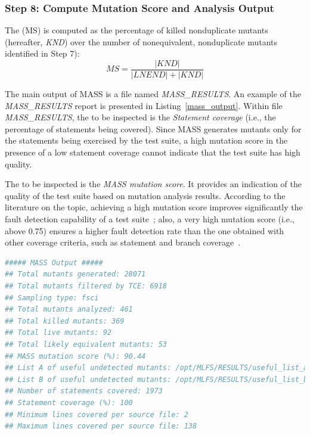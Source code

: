 {\subsubsection{Step 8: Compute Mutation Score and Analysis Output}
\label{sec:appr:score}
%
%
The  (MS) is computed as the percentage of killed nonduplicate mutants
(hereafter, \emph{KND})
over the number of nonequivalent, nonduplicate mutants identified in Step 7):
%
\begin{equation}
\label{equation:ms}
\mathit{MS} = \frac{|\mathit{KND}|}{|\mathit{LNEND}|+|\mathit{KND}|}
\end{equation}



The main output of MASS is a file named \emph{MASS\_RESULTS}. An example of the \emph{MASS\_RESULTS} report is presented in Listing~\ref{mass_output}. Within file \emph{MASS\_RESULTS}, the  to be inspected is the \emph{Statement coverage} (i.e., the percentage of statements being covered). Since MASS generates mutants only for the statements being exercised by the test suite, a high mutation score in the presence of a low statement coverage cannot indicate that the test suite has high quality. 

The  to be inspected is the \emph{MASS mutation score}. It provides an indication of the quality of the test suite based on mutation analysis results. According to the literature on the topic,
 achieving a high mutation score improves significantly the fault detection capability of a test suite~\cite{papadakis2018mutation}; also, a very high mutation score (i.e., above 0.75) ensures a higher fault detection rate than the one obtained with other coverage criteria, such as statement and branch coverage~\cite{Chekam:17}.
 
\begin{lstlisting}[language=bash, label=mass_output, caption=\MASS output obtained with the MLFS case study subject.]
##### MASS Output #####
## Total mutants generated: 28071
## Total mutants filtered by TCE: 6918
## Sampling type: fsci
## Total mutants analyzed: 461
## Total killed mutants: 369
## Total live mutants: 92
## Total likely equivalent mutants: 53
## MASS mutation score (%): 90.44
## List A of useful undetected mutants: /opt/MLFS/RESULTS/useful_list_a
## List B of useful undetected mutants: /opt/MLFS/RESULTS/useful_list_b
## Number of statements covered: 1973
## Statement coverage (%): 100
## Minimum lines covered per source file: 2
## Maximum lines covered per source file: 138
\end{lstlisting}

}
